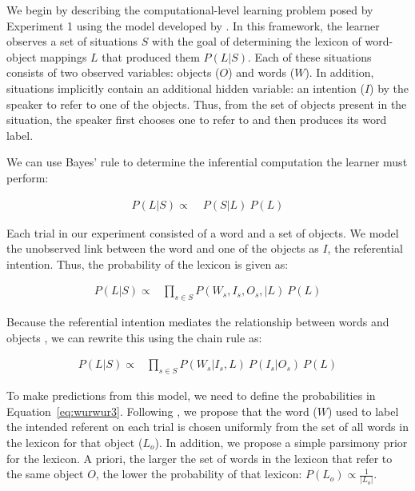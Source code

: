 \documentclass[man,floatsintext]{apa6}
\begin{document}
We begin by describing the computational-level learning problem posed by Experiment 1 using the model developed by . In this framework, the learner observes a set of situations $S$ with the goal of determining the lexicon of word-object mappings $L$ that produced them $P(L|S)$. Each of these situations consists of two observed variables: objects ($O$) and words ($W$). In addition, situations implicitly contain an additional hidden variable: an intention ($I$) by the speaker to refer to one of the objects. Thus, from the set of objects present in the situation, the speaker first chooses one to refer to and then produces its word label. 

We can use Bayes' rule to determine the inferential computation the learner must perform: 

\begin{align} 
P(L|S) \propto & \;P(S|L) \: P(L) \label{eq:wurwur1}
\end{align}

\noindent Each trial in our experiment consisted of a word and a set of objects. We model the unobserved link between the word and one of the objects as $I$, the referential intention. Thus, the probability of the lexicon is given as:

\begin{align}
P(L|S) \propto & \prod\limits_{s\in{S}}P(W_{s},I_{s}, O_{s},|L) \: P(L) \label{eq:wurwur2}
\end{align}

\noindent Because the referential intention mediates the relationship between words and objects \cite{Frank2009a}, we can rewrite this using the chain rule as:

\begin{align}
P(L|S) \propto & \prod\limits_{s\in{S}}P(W_{s}| I_{s}, L) \: P(I_{s}|O_{s})  \: P(L) \label{eq:wurwur3}
\end{align}

To make predictions from this model, we need to define the probabilities in Equation~\ref{eq:wurwur3}. Following , we propose that the word  ($W$) used to label the intended referent on each trial is chosen uniformly from the set of all words in the lexicon for that object ($L_{o}$). In addition, we propose a simple parsimony prior for the lexicon. A priori, the larger the set of words in the lexicon that refer to the same object $O$, the lower the probability of that lexicon: $P(L_{o}) \propto \frac{1}{|L_{o}|}$. 
\end{document}
